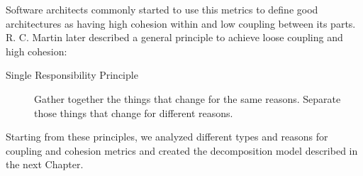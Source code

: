Software architects commonly started to use this metrics to define good architectures as having high cohesion within and low coupling between its parts. R. C. Martin later described a general principle to achieve loose coupling and high cohesion:

\begin{description}
	\item[Single Responsibility Principle] Gather together the things that change for the same reasons. Separate those things that change for different reasons.\cite{SRP}
\end{description}

Starting from these principles, we analyzed different types and reasons for coupling and cohesion metrics and created the decomposition model described in the next Chapter.


